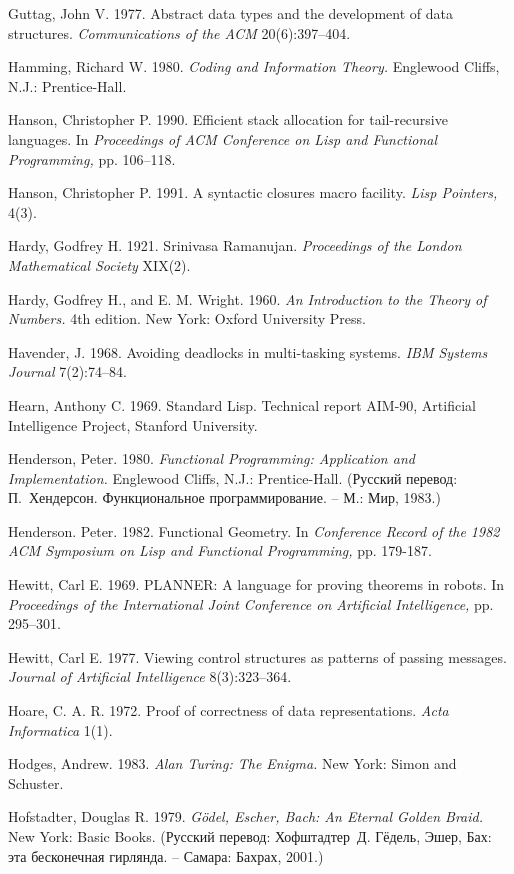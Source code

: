 {Guttag, John V.  1977.  Abstract data types and the development of
data structures.  {\em Communications of the ACM} 20(6):397--404.

Hamming, Richard W.  1980.  {\em Coding and Information Theory.}
Englewood Cliffs, N.J.: Prentice-Hall.

Hanson, Christopher P.  1990.  Efficient stack allocation for
tail-recursive languages.  In {\em Proceedings of ACM Conference on
Lisp and Functional Programming,} pp. 106--118.

Hanson, Christopher P.  1991.  A syntactic closures macro facility.
{\em Lisp Pointers,} 4(3).

Hardy, Godfrey H.  1921.  Srinivasa Ramanujan.  {\em Proceedings of
the London Ma\-the\-matical Society} XIX(2).

Hardy, Godfrey H., and E. M. Wright.  1960.  {\em An Introduction to
the Theory of Numbers.}  4th edition.  New York: Oxford University
Press.

Havender, J. 1968. Avoiding deadlocks in multi-tasking systems. {\em IBM Systems Journal} 7(2):74--84.

Hearn, Anthony C.  1969.  Standard Lisp.  Technical report AIM-90,
Artificial Intel\-li\-gence Project, Stanford University.

Henderson, Peter. 1980.  {\em Functional Programming: Application and
Imp\-le\-men\-ta\-tion.} Englewood Cliffs, N.J.: Prentice-Hall. (Русский
перевод: П.~Хендерсон. Функциональное программирование. -- М.: Мир, 1983.)

Henderson. Peter. 1982. Functional Geometry. In {\em Conference Record
of the 1982 ACM Symposium on Lisp and Functional Programming,}
pp. 179-187.

Hewitt, Carl E.  1969.  PLANNER: A language for proving theorems in
robots.  In {\em Proceedings of the International Joint Conference on
Artificial Intelligence,} pp. 295--301.

Hewitt, Carl E.  1977.  Viewing control structures as patterns of
passing messages.  {\em Journal of Artificial Intelligence}
8(3):323--364.

Hoare, C. A. R. 1972.  Proof of correctness of data representations.
{\em Acta Informa\-tica} 1(1).

Hodges, Andrew. 1983.  {\em Alan Turing: The Enigma.} New York: Simon
and Schuster.

Hofstadter, Douglas R.  1979.  {\em Gödel, Escher, Bach: An Eternal
Golden Braid.} New York: Basic Books. (Русский перевод: Хофштадтер~Д.
Гёдель, Эшер, Бах: эта бесконечная гирлянда. -- Самара: Бахрах, 2001.)

}
